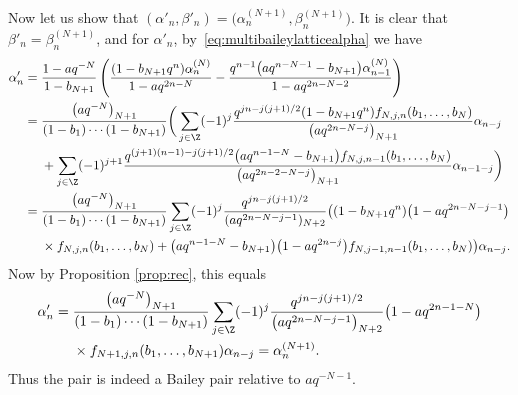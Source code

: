 Now let us show that $(\alpha'_n,\beta'_n) = \bigl(\alpha^{(N+1)}_n,\beta^{(N+1)}_n\bigr)$.
It is clear that $\beta'_n=\beta^{(N+1)}_n$, and for $\alpha'_n$, by~\eqref{eq:multibaileylatticealpha} we have
\begin{align*}
\alpha'_n
={}&\frac{1-aq^{-N}}{1-b_{N+1}}\left(\frac{(1-b_{N+1}q^n) \alpha_n^{(N)}}{1-aq^{2n-N}}-\frac{q^{n-1}\bigl(aq^{n-N-1}-b_{N+1}\bigr) \alpha_{n-1}^{(N)}}{1-aq^{2n-N-2}}\right)\\
={}& \frac{\bigl(aq^{-N}\bigr)_{N+1}}{(1-b_1)\cdots(1-b_{N+1})} \bigg(\sum_{j \in \Z}(-1)^j\frac{q^{jn-j(j+1)/2}(1-b_{N+1}q^n)f_{N,j,n}(b_1,\ldots,b_N)}{\bigl(aq^{2n-N-j}\bigr)_{N+1}} \alpha_{n-j} \\
& +\sum_{j \in \Z}(-1)^{j+1}\frac{q^{(j+1)(n-1)-j(j+1)/2}\bigl(aq^{n-1-N}-b_{N+1}\bigr)f_{N,j,n-1}(b_1,\ldots,b_N)}{\bigl(aq^{2n-2-N-j}\bigr)_{N+1}} \alpha_{n-1-j} \bigg)\\
={}& \frac{\bigl(aq^{-N}\bigr)_{N+1}}{(1-b_1)\cdots(1-b_{N+1})} \sum_{j \in \Z}(-1)^j\frac{q^{jn-j(j+1)/2}}{(aq^{2n-N-j-1})_{N+2}} \big( (1-b_{N+1}q^n)\bigl(1-aq^{2n-N-j-1}\bigr)
\\
& \times f_{N,j,n}(b_1,\ldots,b_N)+ \bigl(aq^{n-1-N}-b_{N+1}\bigr)\bigl(1-aq^{2n-j}\bigr)f_{N,j-1,n-1}(b_1,\ldots,b_N) \big) \alpha_{n-j}.
\end{align*}
Now by Proposition \ref{prop:rec}, this equals
\begin{align*}
\alpha'_n
={}& \frac{\bigl(aq^{-N}\bigr)_{N+1}}{(1-b_1)\cdots(1-b_{N+1})} \sum_{j \in \Z}(-1)^j\frac{q^{jn-j(j+1)/2}}{\bigl(aq^{2n-N-j-1}\bigr)_{N+2}} \bigl(1-aq^{2n-1-N}\bigr)\\
&\times f_{N+1,j,n}(b_1,\ldots,b_{N+1}) \alpha_{n-j}
= \alpha_n^{(N+1)}.
\end{align*}
Thus the pair  is indeed a Bailey pair relative to $aq^{-N-1}$.
